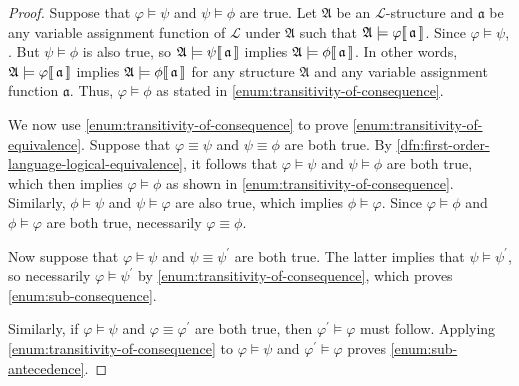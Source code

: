 \begin{proof}
    Suppose that \( \varphi \models \psi \) and \( \psi \models \phi \) are true.
    Let \( \mathfrak{A} \) be an \( \mathcal{L} \)-structure and \( \mathfrak{a} \) be any
    variable assignment function of \( \mathcal{L} \) under \( \mathfrak{A} \) such that
    \(  \mathfrak{A} \models \varphi\llbracket\, \mathfrak{a} \,\rrbracket \).
    Since \( \varphi \models \psi \), .
    But \( \psi \models \phi \) is also true, so \(  \mathfrak{A} \models \psi\llbracket\, \mathfrak{a} \,\rrbracket \)
    implies \(  \mathfrak{A} \models \phi\llbracket\, \mathfrak{a} \,\rrbracket \). In other words, \(  \mathfrak{A} \models \varphi\llbracket\, \mathfrak{a} \,\rrbracket \)
    implies \(  \mathfrak{A} \models \phi\llbracket\, \mathfrak{a} \,\rrbracket \) for any structure \( \mathfrak{A} \) and any variable assignment function \( \mathfrak{a} \).
    Thus, \( \varphi \models \phi \) as stated in \ref{enum:transitivity-of-consequence}.

    \vspace{0.3cm}
    \noindent
    We now use \ref{enum:transitivity-of-consequence} to prove \ref{enum:transitivity-of-equivalence}.
    Suppose that \( \varphi \equiv \psi \) and \( \psi \equiv \phi \) are both true.
    By \cref{dfn:first-order-language-logical-equivalence}, it follows that \( \varphi \models \psi \) and \( \psi \models \phi \) are both true, which
    then implies \( \varphi \models \phi \) as shown in \ref{enum:transitivity-of-consequence}.
    Similarly, \( \phi \models \psi \) and \( \psi \models \varphi \) are also true, which implies \( \phi \models \varphi \).
    Since \( \varphi \models \phi \) and \( \phi \models \varphi \) are both true, necessarily \( \varphi \equiv \phi \).

    \vspace{0.3cm}
    \noindent
    Now suppose that \( \varphi \models \psi \) and \( \psi \equiv \psi^{\prime} \) are both true. The latter implies that \( \psi \models \psi^{\prime} \), so
    necessarily \( \varphi \models \psi^{\prime} \) by \ref{enum:transitivity-of-consequence}, which proves \ref{enum:sub-consequence}.
    
    \vspace{0.3cm}
    \noindent
    Similarly, if \( \varphi \models \psi \) and \( \varphi \equiv \varphi^{\prime} \) are both true, then \( \varphi^{\prime} \models \varphi \) must follow.
    Applying \ref{enum:transitivity-of-consequence} to \( \varphi \models \psi \) and \( \varphi^{\prime} \models \varphi \) proves \ref{enum:sub-antecedence}.
\end{proof}

